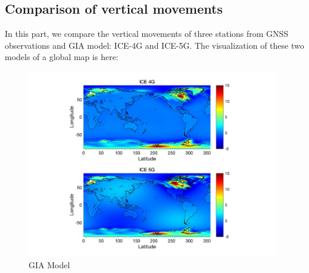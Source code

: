 \documentclass{article}
\begin{document}
\subsection{Comparison of vertical movements}
In this part, we compare the vertical movements of three stations from GNSS observations and GIA model: ICE-4G and ICE-5G.
The visualization of these two models of a global map is here:
\begin{figure}[H]
  \centering
  \includegraphics[width=11cm]{../result/re_figure/fig_kiru/1.jpg}
  \captionsetup{skip=0.2cm}
  \caption{GIA Model}
  \label{fig:GIA_global}
\end{figure}
\end{document}
